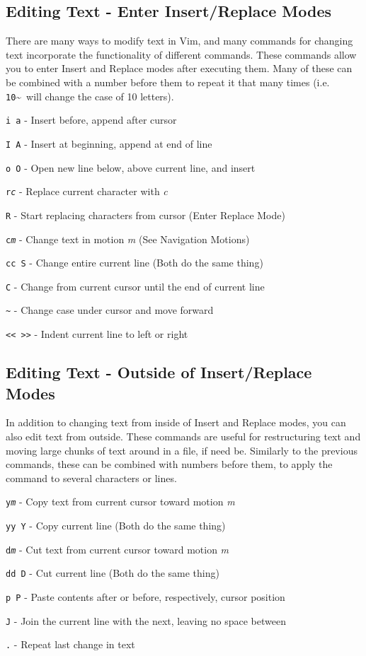 \documentclass[11pt]{article}
\begin{document}
\subsection*{Editing Text - Enter Insert/Replace Modes}
There are many ways to modify text in Vim, and many commands for changing text incorporate the functionality of different commands. These commands allow you to enter Insert and Replace modes after executing them. Many of these can be combined with a number before them to repeat it that many times (i.e. \texttt{10}\~~will change the case of 10 letters).
\begin{description}
	\item{\texttt{i a}} - Insert before, append after cursor
	\item{\texttt{I A}} - Insert at beginning, append at end of line
	\item{\texttt{o O}} - Open new line below, above current line, and insert
	\item{\texttt{r\textit{c}}} - Replace current character with \textit{c}
	\item{\texttt{R}} - Start replacing characters from cursor (Enter Replace Mode)
	\item{\texttt{c\textit{m}}} - Change text in motion \textit{m} (See Navigation Motions)
	\item{\texttt{cc S}} - Change entire current line (Both do the same thing) 
	\item{\texttt{C}} - Change from current cursor until the end of current line
	\item{\texttt{\~}} - Change case under cursor and move forward
	\item{\texttt{<< >>}} - Indent current line to left or right
\end{description}
\newpage
\subsection*{Editing Text - Outside of Insert/Replace Modes}
In addition to changing text from inside of Insert and Replace modes, you can also edit text from outside. These commands are useful for restructuring text and moving large chunks of text around in a file, if need be. Similarly to the previous commands, these can be combined with numbers before them, to apply the command to several characters or lines.
\begin{description}
	\item{\texttt{y\textit{m}}} - Copy text from current cursor toward motion \textit{m}
	\item{\texttt{yy Y}} - Copy current line (Both do the same thing)
	\item{\texttt{d\textit{m}}} - Cut text from current cursor toward motion \textit{m}
	\item{\texttt{dd D}} - Cut current line (Both do the same thing)
	\item{\texttt{p P}} - Paste contents after or before, respectively, cursor position
	\item{\texttt{J}} - Join the current line with the next, leaving no space between 
	\item{\texttt{.}} - Repeat last change in text
\end{description}
\end{document}
